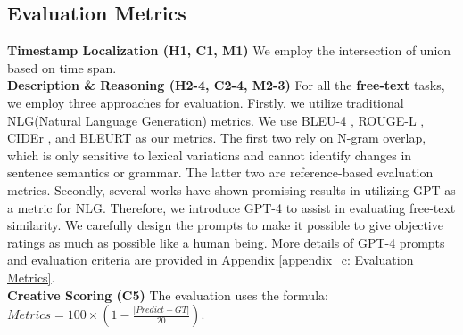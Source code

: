 \subsection{Evaluation Metrics}
\noindent\textbf{Timestamp Localization (H1, C1, M1)}\quad 
We employ the intersection of union based on time span. \\
\noindent\textbf{Description \& Reasoning (H2-4, C2-4, M2-3)}\quad
For all the \textbf{free-text} tasks, we employ three approaches for evaluation. Firstly, we utilize traditional NLG(Natural Language Generation) metrics. We use BLEU-4 \cite{papineni2002bleu}, ROUGE-L \cite{lin2004rouge}, CIDEr \cite{vedantam2015cider}, and BLEURT \cite{pu2021learning} as our metrics. The first two rely on N-gram overlap, which is only sensitive to lexical variations and cannot identify changes in sentence semantics or grammar. The latter two are reference-based evaluation metrics. Secondly, several works \cite{wang2023chatgpt, fu2023gptscore, kamalloo2023evaluating, chiang2023can} have shown promising results in utilizing GPT as a metric for NLG. Therefore, we introduce GPT-4 to assist in evaluating free-text similarity. We carefully design the prompts to make it possible to give objective ratings as much as possible like a human being. More details of GPT-4 prompts and evaluation criteria are provided in Appendix 
\ref{appendix_c: Evaluation Metrics}.\\
\noindent\textbf{Creative Scoring (C5)}\quad
The evaluation uses the formula: $Metrics = 100 \times \left(1 - \frac{{\lvert Predict - GT \rvert}}{{20}}\right)$.



